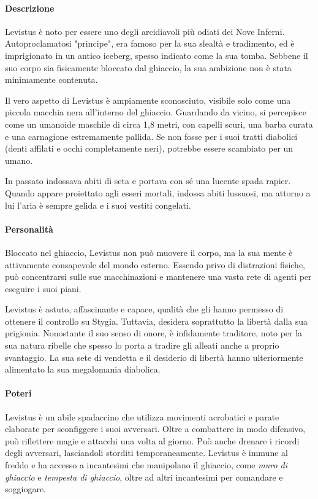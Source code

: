 \documentclass{article}
\begin{document}
            \paragraph*{Descrizione}
            Levistus è noto per essere uno degli arcidiavoli più odiati dei Nove Inferni. Autoproclamatosi "principe", era famoso per la sua slealtà e tradimento, ed è imprigionato in un antico iceberg, spesso indicato come la sua tomba. Sebbene il suo corpo sia fisicamente bloccato dal ghiaccio, la sua ambizione non è stata minimamente contenuta.
            
            Il vero aspetto di Levistus è ampiamente sconosciuto, visibile solo come una piccola macchia nera all'interno del ghiaccio. Guardando da vicino, si percepisce come un umanoide maschile di circa 1,8 metri, con capelli scuri, una barba curata e una carnagione estremamente pallida. Se non fosse per i suoi tratti diabolici (denti affilati e occhi completamente neri), potrebbe essere scambiato per un umano.
            
            In passato indossava abiti di seta e portava con sé una lucente spada rapier. Quando appare proiettato agli esseri mortali, indossa abiti lussuosi, ma attorno a lui l'aria è sempre gelida e i suoi vestiti congelati.
            
            \paragraph*{Personalità}
            Bloccato nel ghiaccio, Levistus non può muovere il corpo, ma la sua mente è attivamente consapevole del mondo esterno. Essendo privo di distrazioni fisiche, può concentrarsi sulle sue macchinazioni e mantenere una vasta rete di agenti per eseguire i suoi piani.
            
            Levistus è astuto, affascinante e capace, qualità che gli hanno permesso di ottenere il controllo su Stygia. Tuttavia, desidera soprattutto la libertà dalla sua prigionia. Nonostante il suo senso di onore, è infidamente traditore, noto per la sua natura ribelle che spesso lo porta a tradire gli alleati anche a proprio svantaggio. La sua sete di vendetta e il desiderio di libertà hanno ulteriormente alimentato la sua megalomania diabolica.
            
            \paragraph*{Poteri}
            Levistus è un abile spadaccino che utilizza movimenti acrobatici e parate elaborate per sconfiggere i suoi avversari. Oltre a combattere in modo difensivo, può riflettere magie e attacchi una volta al giorno. Può anche drenare i ricordi degli avversari, lasciandoli storditi temporaneamente. Levistus è immune al freddo e ha accesso a incantesimi che manipolano il ghiaccio, come \textit{muro di ghiaccio} e \textit{tempesta di ghiaccio}, oltre ad altri incantesimi per comandare e soggiogare.
            
\end{document}

